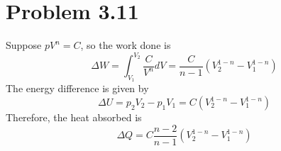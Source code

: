\documentclass{article}
\begin{document}
	
\section*{Problem 3.11}
	Suppose $pV^{n} = C$, so the work done is
	\begin{equation}
	\Delta W = \int^{V_{2}}_{V_{1}} \frac{C}{V^{n}} dV = \frac{C}{n-1} (V^{1-n}_{2}	 - V^{1-n}_{1})
	\end{equation}
	The energy difference is given by
	\begin{equation}
	\Delta U = p_{2}V_{2} - p_{1}V_{1} = C (V^{1-n}_{2} - V^{1-n}_{1})
	\end{equation}
	Therefore, the heat absorbed is
	\begin{equation}
	\Delta Q =  C\frac{n-2}{n-1} (V^{1-n}_{2} - V^{1-n}_{1})
	\end{equation}
\end{document}
